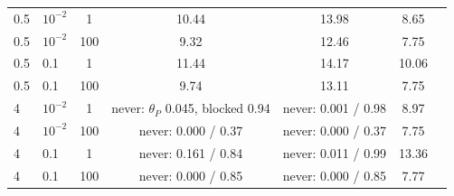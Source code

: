 \documentclass[11pt,letterpaper]{article}
\begin{document}
\begin{table}[tbp]
\begin{tabular}{llccccc}
\midrule
0.5 & $10^{-2}$ & 1 & 10.44 & 13.98 & 8.65 & \\
0.5 & $10^{-2}$ & 100 & 9.32 & 12.46 & 7.75 & \\
0.5 & 0.1 & 1 & 11.44 & 14.17 & 10.06 & \\
0.5 & 0.1 & 100 & 9.74 & 13.11 & 7.75 & \\
4 & $10^{-2}$ & 1 & never: $\theta_P$ 0.045, blocked 0.94 & never: 0.001 / 0.98 & 8.97 & \\
4 & $10^{-2}$ & 100 & never: 0.000 / 0.37 & never: 0.000 / 0.37 & 7.75 & \\
4 & 0.1 & 1 & never: 0.161 / 0.84 & never: 0.011 / 0.99 & 13.36 & \\
4 & 0.1 & 100 & never: 0.000 / 0.85 & never: 0.000 / 0.85 & 7.77 & \\
\bottomrule
\end{tabular}
\end{table}
\end{document}
